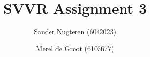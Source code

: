 \documentclass{article}
\begin{document}
\title{SVVR Assignment 3}
\author{Sander Nugteren (6042023) \and Merel de Groot (6103677)}
\renewcommand{\today}{November 24, 2014}
\maketitle
\end{document}

